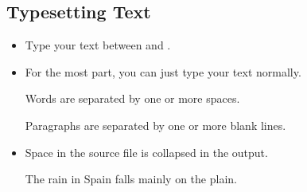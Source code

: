 \documentclass{beamer}
\begin{document}
\subsection{Typesetting Text}
\begin{frame}[fragile]{\insertsubsection{}}
\small
\begin{itemize}
\item Type your text between  and .
\item For the most part, you can just type your text normally.
\begin{exampletwouptiny}
Words are separated by one or more
spaces.

Paragraphs are separated by one
or more blank lines.
\end{exampletwouptiny}
\item Space in the source file is collapsed in the output.
\begin{exampletwouptiny}
The   rain       in Spain
falls mainly on the plain.
\end{exampletwouptiny}
\end{itemize}
\end{frame}
\end{document}
